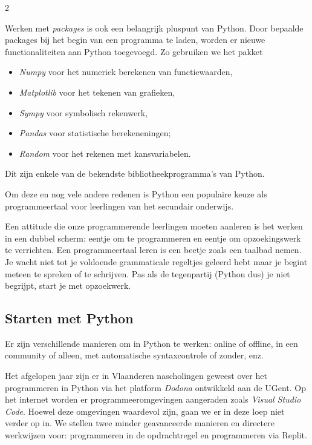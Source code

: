 \begin{multicols}{2}
	
	Werken met \emph{packages} is ook een belangrijk pluspunt van Python. Door bepaalde packages bij  het begin van een programma te laden, worden er nieuwe functionaliteiten aan Python toegevoegd. Zo gebruiken we het pakket
	\begin{itemize}
	\item \emph{Numpy} voor het numeriek berekenen van functiewaarden, 
	\item \emph{Matplotlib} voor het tekenen van grafieken, 
	\item \emph{Sympy} voor symbolisch rekenwerk, 
	\item \emph{Pandas} voor statistische berekeneningen;
	\item \emph{Random} voor het rekenen met kansvariabelen. 
	\end{itemize}
	Dit zijn enkele van de bekendste bibliotheekprogramma's van Python.
	
	Om deze en nog vele andere redenen is Python een populaire keuze als programmeertaal voor leerlingen van het secundair onderwijs. 
	
	Een attitude die onze programmerende leerlingen moeten aanleren is het werken in een dubbel scherm: eentje om te programmeren en eentje om opzoekingswerk te verrichten. Een programmeertaal leren is een beetje zoals een taalbad nemen. Je wacht niet tot je voldoende grammaticale regeltjes geleerd hebt maar je begint meteen te spreken of te schrijven. Pas als de tegenpartij (Python dus) je niet begrijpt, start je met opzoekwerk.
	
	\subsection{Starten met Python}
	
	Er zijn verschillende manieren om in Python te werken: online of offline, in een community of alleen, met automatische syntaxcontrole of zonder, enz.
	
	Het afgelopen jaar zijn er in Vlaanderen nascholingen geweest over het programmeren in Python via het platform \emph{Dodona} ontwikkeld aan de UGent. Op het internet worden er programmeeromgevingen aangeraden zoals \emph{Visual Studio Code}. Hoewel deze omgevingen waardevol zijn, gaan we er in deze loep niet verder op in. We stellen twee minder geavanceerde manieren en directere werkwijzen voor: programmeren in de opdrachtregel en programmeren via Replit.
	

\end{multicols}
